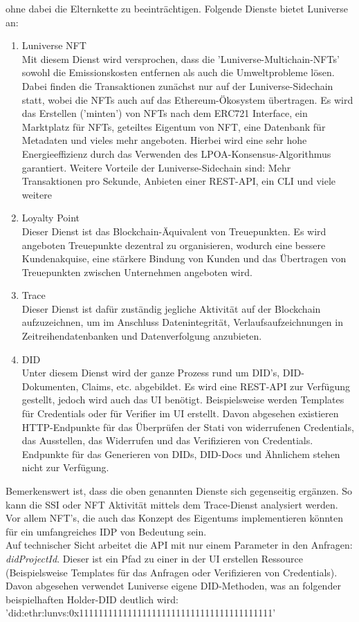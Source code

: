 ohne dabei die Elternkette zu beeinträchtigen.
Folgende Dienste bietet Luniverse an:
\begin{enumerate}
	\item Luniverse NFT \\
	Mit diesem Dienst wird versprochen, dass die 'Luniverse-Multichain-NFTs' sowohl die Emissionskosten entfernen als auch die Umweltprobleme lösen. Dabei finden die Transaktionen zunächst nur auf der Luniverse-Sidechain statt, wobei die NFTs auch auf das Ethereum-Ökosystem übertragen. Es wird das Erstellen ('minten') von NFTs nach dem ERC721 Interface, ein Marktplatz für NFTs, geteiltes Eigentum von NFT, eine Datenbank für Metadaten und vieles mehr angeboten. Hierbei wird eine sehr hohe Energieeffizienz durch das Verwenden des LPOA-Konsensus-Algorithmus garantiert.
	Weitere Vorteile der Luniverse-Sidechain sind: Mehr Transaktionen pro Sekunde, Anbieten einer REST-API, ein CLI und viele weitere
	
	\item Loyalty Point \\
	Dieser Dienst ist das Blockchain-Äquivalent von Treuepunkten. Es wird angeboten Treuepunkte dezentral zu organisieren, wodurch eine bessere Kundenakquise, eine stärkere Bindung von Kunden und das Übertragen von Treuepunkten zwischen Unternehmen angeboten wird.
	
	\item Trace \\
	Dieser Dienst ist dafür zuständig jegliche Aktivität auf der Blockchain aufzuzeichnen, um im Anschluss Datenintegrität, Verlaufsaufzeichnungen in Zeitreihendatenbanken und Datenverfolgung anzubieten.
	
	
	\item DID \\
	Unter diesem Dienst wird der ganze Prozess rund um DID's, DID-Dokumenten, Claims, etc. abgebildet. Es wird eine REST-API zur Verfügung gestellt, jedoch wird auch das UI benötigt. Beispielsweise werden Templates für Credentials oder für Verifier im UI erstellt.
	Davon abgesehen existieren HTTP-Endpunkte für das Überprüfen der Stati von widerrufenen Credentials, das Ausstellen, das Widerrufen und das Verifizieren von Credentials. Endpunkte für das Generieren von DIDs, DID-Docs und Ähnlichem stehen nicht zur Verfügung.
	
\end{enumerate}

Bemerkenswert ist, dass die oben genannten Dienste sich gegenseitig ergänzen. So kann die SSI oder NFT Aktivität mittels dem Trace-Dienst analysiert werden. Vor allem NFT's, die auch das Konzept des Eigentums implementieren könnten für ein umfangreiches IDP von Bedeutung sein. \\
Auf technischer Sicht arbeitet die API mit nur einem Parameter in den Anfragen: \textsl{didProjectId}. Dieser ist ein Pfad zu einer in der UI erstellen Ressource (Beispielsweise Templates für das Anfragen oder Verifizieren von Credentials). Davon abgesehen verwendet Luniverse eigene DID-Methoden, was an folgender beispielhaften Holder-DID deutlich wird: 'did:ethr:lunvs:0x1111111111111111111111111111111111111111' 

